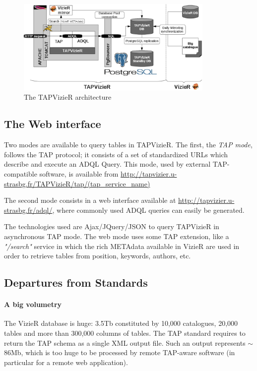 \begin{figure}[hbp] \center
\includegraphics[width=0.85\textwidth]{part8/Landais_P44/P044_fig1.eps}
\caption{The TAPVizieR architecture}\label{P044:architecture}
\end{figure}

\subsection{The Web interface}
\label{P044:web_interface}
Two modes are available to query tables in TAPVizieR. The first, the {\em TAP mode}, follows the TAP protocol; it consists of a set of standardized URLs which describe and execute an ADQL Query. This mode, used by external TAP-compatible software, is available from {\small\url{http://tapvizier.u-strasbg.fr/TAPVizieR/tap/(tap_service_name)}}

The second mode consists in a web interface available at {\small\url{http://tapvizier.u-strasbg.fr/adql/}}, where commonly used ADQL queries can easily be generated.

The technologies used are Ajax/JQuery/JSON to query TAPVizieR in asynchronous TAP mode. The web mode uses some TAP extension, like a \textit{"/search"} service in which the rich METAdata available in VizieR are used in order to retrieve tables from position, keywords, authors, etc.


\subsection{Departures from Standards}

\paragraph{A big volumetry}

The VizieR database is huge:  3.5Tb constituted by 10,000 catalogues, 20,000 tables and more than 300,000 columns of tables. The TAP standard requires to return the TAP schema as a single XML output file. Such an output represents $\sim$86Mb, which is too huge to be processed by remote TAP-aware software (in particular for a remote web application).

